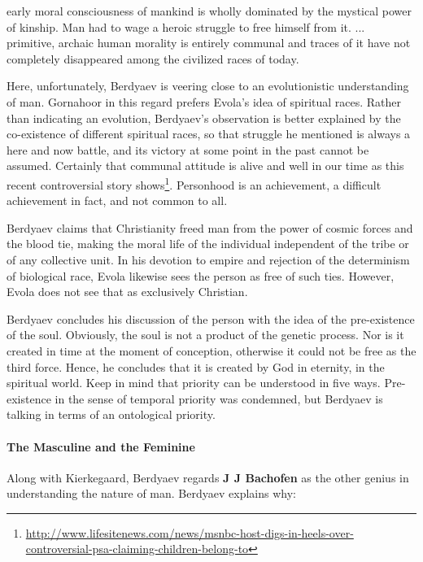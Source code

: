 \begin{quotex}
early moral consciousness of mankind is wholly dominated by the mystical power of kinship. Man had to wage a heroic struggle to free himself from it. ... primitive, archaic human morality is entirely communal and traces of it have not completely disappeared among the civilized races of today.
\end{quotex}


Here, unfortunately, Berdyaev is veering close to an evolutionistic understanding of man. Gornahoor in this regard prefers Evola's idea of spiritual races. Rather than indicating an evolution, Berdyaev's observation is better explained by the co-existence of different spiritual races, so that struggle he mentioned is always a here and now battle, and its victory at some point in the past cannot be assumed. Certainly that communal attitude is alive and well in our time as this recent controversial story shows\footnote{\url{http://www.lifesitenews.com/news/msnbc-host-digs-in-heels-over-controversial-psa-claiming-children-belong-to}}. Personhood is an achievement, a difficult achievement in fact, and not common to all.

Berdyaev claims that Christianity freed man from the power of cosmic forces and the blood tie, making the moral life of the individual independent of the tribe or of any collective unit. In his devotion to empire and rejection of the determinism of biological race, Evola likewise sees the person as free of such ties. However, Evola does not see that as exclusively Christian.

Berdyaev concludes his discussion of the person with the idea of the pre-existence of the soul. Obviously, the soul is not a product of the genetic process. Nor is it created in time at the moment of conception, otherwise it could not be free as the third force. Hence, he concludes that it is created by God in eternity, in the spiritual world. Keep in mind that priority can be understood in five ways. Pre-existence in the sense of temporal priority was condemned, but Berdyaev is talking in terms of an ontological priority.

\paragraph{The Masculine and the Feminine}


Along with Kierkegaard, Berdyaev regards \textbf{J J Bachofen} as the other genius in understanding the nature of man. Berdyaev explains why:

